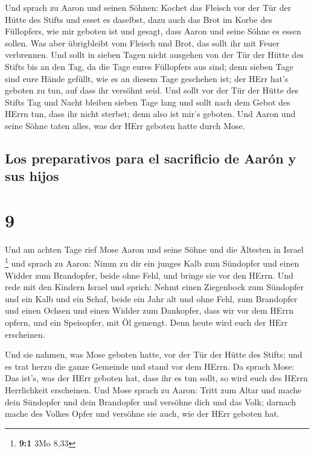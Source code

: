  Und sprach zu Aaron und seinen Söhnen: Kochet das
Fleisch vor der Tür der Hütte des Stifts und esset es daselbst, dazu
auch das Brot im Korbe des Füllopfers, wie mir geboten ist und gesagt,
dass Aaron und seine Söhne es essen sollen.  Was aber
übrigbleibt vom Fleisch und Brot, das sollt ihr mit Feuer verbrennen.
 Und sollt in sieben Tagen nicht ausgehen von der Tür der
Hütte des Stifts bis an den Tag, da die Tage eures Füllopfers aus sind;
denn sieben Tage sind eure Hände gefüllt,  wie es an
diesem Tage geschehen ist; der HErr hat's geboten zu tun, auf dass ihr
versöhnt seid.  Und sollt vor der Tür der Hütte des
Stifts Tag und Nacht bleiben sieben Tage lang und sollt nach dem Gebot
des HErrn tun, dass ihr nicht sterbet; denn also ist mir's geboten.
 Und Aaron und seine Söhne taten alles, was der HErr
geboten hatte durch Mose.

\hypertarget{los-preparativos-para-el-sacrificio-de-aaruxf3n-y-sus-hijos}{%
\subsection{Los preparativos para el sacrificio de Aarón y sus
hijos}\label{los-preparativos-para-el-sacrificio-de-aaruxf3n-y-sus-hijos}}

\hypertarget{section-8}{%
\section{9}\label{section-8}}

 Und am achten Tage rief Mose Aaron und seine Söhne und
die Ältesten in Israel \footnote{\textbf{9:1} 3Mo 8,33} 
und sprach zu Aaron: Nimm zu dir ein junges Kalb zum Sündopfer und einen
Widder zum Brandopfer, beide ohne Fehl, und bringe sie vor den HErrn.
 Und rede mit den Kindern Israel und sprich: Nehmt einen
Ziegenbock zum Sündopfer und ein Kalb und ein Schaf, beide ein Jahr alt
und ohne Fehl, zum Brandopfer  und einen Ochsen und einen
Widder zum Dankopfer, dass wir vor dem HErrn opfern, und ein Speisopfer,
mit Öl gemengt. Denn heute wird euch der HErr erscheinen.

 Und sie nahmen, was Mose geboten hatte, vor der Tür der
Hütte des Stifts; und es trat herzu die ganze Gemeinde und stand vor dem
HErrn.  Da sprach Mose: Das ist's, was der HErr geboten
hat, dass ihr es tun sollt, so wird euch des HErrn Herrlichkeit
erscheinen.  Und Mose sprach zu Aaron: Tritt zum Altar und
mache dein Sündopfer und dein Brandopfer und versöhne dich und das Volk;
darnach mache des Volkes Opfer und versöhne sie auch, wie der HErr
geboten hat.

